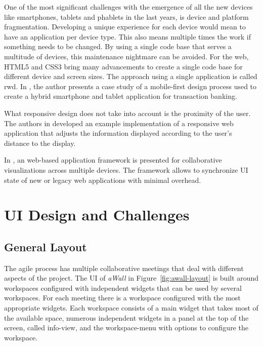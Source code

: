 \documentclass{sigchi}
\begin{document}
One of the most significant challenges with the emergence of all the new devices like smartphones, tablets and phablets in the last years, is device and platform fragmentation.
Developing a unique experience for each device would mean to have an application per device type.
This also means multiple times the work if something needs to be changed. 
By using a single code base that serves a multitude of devices, this maintenance nightmare can be avoided.
For the web, HTML5 and CSS3 bring many advancements to create a single code base for different device and screen sizes.
The approach using a single application is called \gls{rwd}.
In \cite{Pandey:2013:RDT:2525194.2525271}, the author presents a case study of a mobile-first design process used to create a hybrid smartphone and tablet application for transaction banking.

What responsive design does not take into account is the proximity of the user. 
The authors in \cite{Sukale:2014:PWD:2638728.2638768} developed an example implementation of a responsive web application that adjusts the information displayed according to the user's distance to the display.

In \cite{Badam:2014:PCF:2669485.2669518}, an web-based application framework is presented for collaborative visualizations across multiple devices. The framework allows to synchronize UI state of new or legacy web applications with minimal overhead.


\section{UI Design and Challenges}
\subsection{General Layout}
The agile process has multiple collaborative meetings that deal with different aspects of the project.
The UI of \textit{aWall} in Figure~\ref{fig:awall-layout} is built around workspaces configured with independent widgets that can be used by several workspaces.
For each meeting there is a workspace configured with the most appropriate widgets.
Each workspace consists of a main widget that takes most of the available space, numerous independent widgets in a panel at the top of the screen, called info-view, and the workspace-menu with options to configure the workspace.
\end{document}
